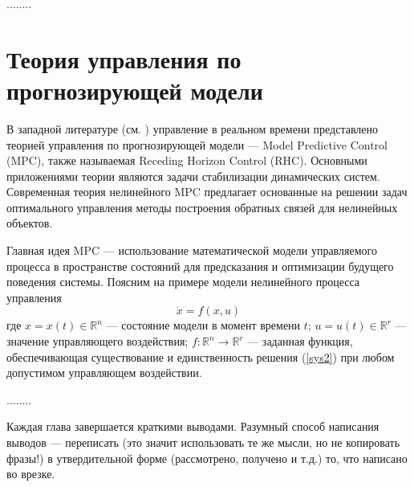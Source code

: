 ........


\section{Теория управления по прогнозирующей модели}\label{1sec:MPC}

В западной литературе (см. \cite{Keerthi, Mayne2000, Mayne}) управление в реальном времени представлено теорией управления по прогнозирующей модели --- Model Predictive Control (MPC), также называемая Receding Horizon Control (RHC). Основными приложениями теории являются задачи стабилизации динамических систем. Современная теория нелинейного MPC предлагает основанные на решении задач оптимального управления методы построения обратных связей для нелинейных объектов.

Главная идея MPC --- использование математической модели управляемого процесса в пространстве состояний для предсказания и оптимизации будущего поведения системы. Поясним на примере модели нелинейного процесса управления
\begin{equation}\label{sys2}
    \dot x = f(x,u)
    \end{equation}
где $x=x(t)\in \mathbb{R}^n$ --- состояние модели  в момент времени $t$; $u=u(t)\in
\mathbb{R}^r$ --- значение управляющего воздействия; $f:\mathbb{R}^n \to \mathbb{R}^r$ --- заданная функция, обеспечивающая существование и единственность решения (\ref{sys2}) при любом допустимом управляющем воздействии.


........

\bigskip

Каждая глава завершается краткими выводами. Разумный способ написания выводов --- переписать (это значит использовать те же мысли, но не копировать фразы!) в утвердительной форме (рассмотрено, получено и т.д.) то, что написано во врезке. 
